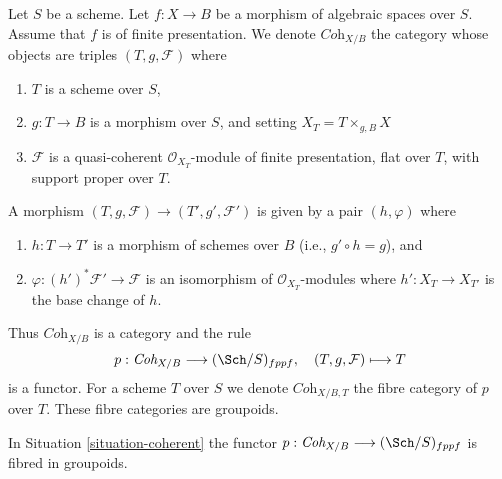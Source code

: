 \begin{situation}
\label{situation-coherent}
Let $S$ be a scheme. Let $f : X \to B$ be a morphism of algebraic spaces
over $S$. Assume that $f$ is of finite presentation.
We denote $\textit{Coh}_{X/B}$ the category whose objects are
triples $(T, g, \mathcal{F})$ where
\begin{enumerate}
\item $T$ is a scheme over $S$,
\item $g : T \to B$ is a morphism over $S$, and setting
$X_T = T \times_{g, B} X$
\item $\mathcal{F}$ is a quasi-coherent $\mathcal{O}_{X_T}$-module
of finite presentation, flat over $T$, with support proper over $T$.
\end{enumerate}
A morphism $(T, g, \mathcal{F}) \to (T', g', \mathcal{F}')$
is given by a pair $(h, \varphi)$ where
\begin{enumerate}
\item $h : T \to T'$ is a morphism of schemes over $B$
(i.e., $g' \circ h = g$), and
\item $\varphi : (h')^*\mathcal{F}' \to \mathcal{F}$ is an
isomorphism of $\mathcal{O}_{X_T}$-modules where $h' : X_T \to X_{T'}$
is the base change of $h$.
\end{enumerate}
\end{situation}

\noindent
Thus $\textit{Coh}_{X/B}$ is a category and the rule
$$
p : \textit{Coh}_{X/B} \longrightarrow (\Sch/S)_{fppf},
\quad
(T, g, \mathcal{F}) \longmapsto T
$$
is a functor. For a scheme $T$ over $S$ we denote $\textit{Coh}_{X/B, T}$
the fibre category of $p$ over $T$. These fibre categories are groupoids.

\begin{lemma}
\label{lemma-coherent-fibred-in-groupoids}
In Situation \ref{situation-coherent} the functor
$p : \textit{Coh}_{X/B} \longrightarrow (\Sch/S)_{fppf}$
is fibred in groupoids.
\end{lemma}

